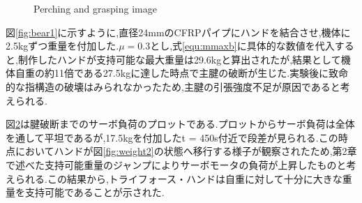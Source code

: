 \documentclass{jarticle}
\begin{document}
\begin{figure}[H]
\begin{subfigure}{0.6\columnwidth}
    \vspace{-6mm}
    \caption{}
    \label{fig:bear2}
  \end{subfigure}
  \vspace{1mm}
  \caption{Perching and grasping image}
  \vspace{-4mm}
\end{figure}
図\ref{fig:bear1}に示すように,直径24mmのCFRPパイプにハンドを結合させ,機体に2.5kgずつ重量を付加した.$\mu = 0.3$とし\cite{friction},式\ref{equ:mmaxb}に具体的な数値を代入すると,制作したハンドが支持可能な最大重量は29.6kgと算出されたが,結果として機体自重の約11倍である27.5kgに達した時点で主腱の破断が生じた.実験後に致命的な指構造の破壊はみられなかったため,主腱の引張強度不足が原因であると考えられる.

図\ref{fig:bear2}は腱破断までのサーボ負荷のプロットである.プロットからサーボ負荷は全体を通して平坦であるが,17.5kgを付加したt = 450s付近で段差が見られる.この時点においてハンドが図\ref{fig:weight2}の状態へ移行する様子が観察されたため,第2章で述べた支持可能重量のジャンプによりサーボモータの負荷が上昇したものと考えられる.この結果から,トライフォース・ハンドは自重に対して十分に大きな重量を支持可能であることが示された.
\end{document}
